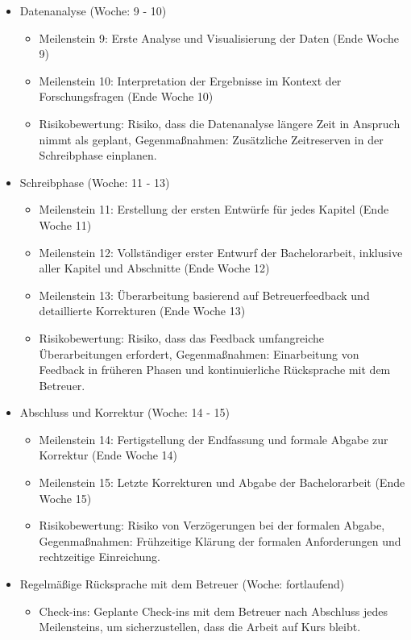 \begin{itemize}
\item Datenanalyse (Woche: 9 - 10) \cite{ChatGPT2024}
\begin{itemize}
    \item Meilenstein 9: Erste Analyse und Visualisierung der Daten (Ende Woche 9) \cite{ChatGPT2024}
    \item Meilenstein 10: Interpretation der Ergebnisse im Kontext der Forschungsfragen (Ende Woche 10) \cite{ChatGPT2024}
    \item Risikobewertung: Risiko, dass die Datenanalyse längere Zeit in Anspruch nimmt als geplant, Gegenmaßnahmen: Zusätzliche Zeitreserven in der Schreibphase einplanen. \cite{ChatGPT2024}
\end{itemize}

\item Schreibphase (Woche: 11 - 13) \cite{ChatGPT2024}
\begin{itemize}
  \item Meilenstein 11: Erstellung der ersten Entwürfe für jedes Kapitel (Ende Woche 11) \cite{ChatGPT2024}
    \item Meilenstein 12: Vollständiger erster Entwurf der Bachelorarbeit, inklusive aller Kapitel und Abschnitte (Ende Woche 12) \cite{ChatGPT2024}
    \item Meilenstein 13: Überarbeitung basierend auf Betreuerfeedback und detaillierte Korrekturen (Ende Woche 13) \cite{ChatGPT2024}
    \item Risikobewertung: Risiko, dass das Feedback umfangreiche Überarbeitungen erfordert, Gegenmaßnahmen: Einarbeitung von Feedback in früheren Phasen und kontinuierliche Rücksprache mit dem Betreuer. \cite{ChatGPT2024}
\end{itemize}

\item Abschluss und Korrektur (Woche: 14 - 15) \cite{ChatGPT2024}
\begin{itemize}
    \item Meilenstein 14: Fertigstellung der Endfassung und formale Abgabe zur Korrektur (Ende Woche 14) \cite{ChatGPT2024}
    \item Meilenstein 15: Letzte Korrekturen und Abgabe der Bachelorarbeit (Ende Woche 15) \cite{ChatGPT2024}
    \item Risikobewertung: Risiko von Verzögerungen bei der formalen Abgabe, Gegenmaßnahmen: Frühzeitige Klärung der formalen Anforderungen und rechtzeitige Einreichung. \cite{ChatGPT2024}
\end{itemize}

\item Regelmäßige Rücksprache mit dem Betreuer (Woche: fortlaufend) \cite{ChatGPT2024}
\begin{itemize}
    \item Check-ins: Geplante Check-ins mit dem Betreuer nach Abschluss jedes Meilensteins, um sicherzustellen, dass die Arbeit auf Kurs bleibt. \cite{ChatGPT2024}
\end{itemize}

\end{itemize}
